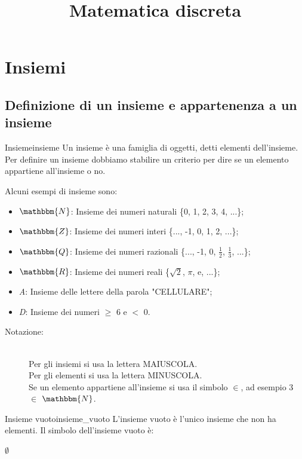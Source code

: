 \documentclass[12pt, letterpaper]{report}
\title{Matematica discreta}
\date{}
\newcounter{definition}
\newcommand{\nmu}{}
\begin{document}
	{
		\let\cleardoublepage\clearpage
		\maketitle
		\tableofcontents
	}
	\chapter{Insiemi}
	\section{Definizione di un insieme e appartenenza a un insieme}
	\begin{definition}{\nmu Insieme}{insieme}
		Un insieme è una famiglia di oggetti, detti elementi dell'insieme.
		Per definire un insieme dobbiamo stabilire un criterio per dire se un elemento appartiene all'insieme o no.
	\end{definition}
	Alcuni esempi di insieme sono:
	\begin{itemize}
		\item $\mathbbm{N}$: Insieme dei numeri naturali \{0, 1, 2, 3, 4, ...\};
		\item $\mathbbm{Z}$: Insieme dei numeri interi \{..., -1, 0, 1, 2, ...\};
		\item $\mathbbm{Q}$: Insieme dei numeri razionali \{..., -1, 0, $\frac{1}{2}$, $\frac{1}{3}$, ...\};
		\item $\mathbbm{R}$: Insieme dei numeri reali \{$\sqrt{2}$, $\pi$, e, ...\};
		\item \textit{A}: Insieme delle lettere della parola "CELLULARE";
		\item \textit{D}: Insieme dei numeri $\geq$ 6 e $<$ 0.
	\end{itemize}
	\begin{description}
		\item[Notazione:] \hfill \\ Per gli insiemi si usa la lettera MAIUSCOLA. \\Per gli elementi si usa la lettera MINUSCOLA. \\ Se un elemento appartiene all'insieme si usa il simbolo $\in$, ad esempio 3 $\in$ $\mathbbm{N}$.
	\end{description}
	\begin{definition}{\nmu Insieme vuoto}{insieme_vuoto}
			L'insieme vuoto è l'unico insieme che non ha elementi. Il simbolo dell'insieme vuoto è:
			\begin{center}
				$\emptyset$
			\end{center}
	\end{definition}
\end{document}
